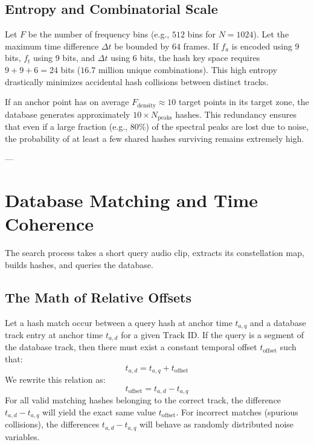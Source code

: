 \documentclass[11pt,journal,onecolumn]{IEEEtran}
\begin{document}
\subsection{Entropy and Combinatorial Scale}
Let $F$ be the number of frequency bins (e.g., $512$ bins for $N=1024$). Let the maximum time difference $\Delta t$ be bounded by $64$ frames.
If $f_a$ is encoded using 9 bits, $f_t$ using 9 bits, and $\Delta t$ using 6 bits, the hash key space requires $9 + 9 + 6 = 24$ bits ($16.7$ million unique combinations). This high entropy drastically minimizes accidental hash collisions between distinct tracks.

If an anchor point has on average $F_{\text{density}} \approx 10$ target points in its target zone, the database generates approximately $10 \times N_{\text{peaks}}$ hashes. This redundancy ensures that even if a large fraction (e.g., 80\%) of the spectral peaks are lost due to noise, the probability of at least a few shared hashes surviving remains extremely high.

---

\section{Database Matching and Time Coherence}

The search process takes a short query audio clip, extracts its constellation map, builds hashes, and queries the database.

\subsection{The Math of Relative Offsets}
Let a hash match occur between a query hash at anchor time $t_{a, q}$ and a database track entry at anchor time $t_{a, d}$ for a given $\text{Track ID}$.
If the query is a segment of the database track, then there must exist a constant temporal offset $t_{\text{offset}}$ such that:
\begin{equation}
t_{a, d} = t_{a, q} + t_{\text{offset}}
\end{equation}
We rewrite this relation as:
\begin{equation}
t_{\text{offset}} = t_{a, d} - t_{a, q}
\end{equation}
For all valid matching hashes belonging to the correct track, the difference $t_{a, d} - t_{a, q}$ will yield the exact same value $t_{\text{offset}}$.
For incorrect matches (spurious collisions), the differences $t_{a, d} - t_{a, q}$ will behave as randomly distributed noise variables.
\end{document}
